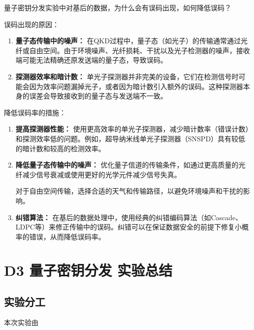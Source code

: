 \documentclass[dvipsnames, svgnames,a4paper,11pt]{article}
\begin{document}
\begin{question}
	量子密钥分发实验中对基后的数据，为什么会有误码出现，如何降低误码？
\end{question}

	误码出现的原因：
	\begin{enumerate}
		\item \textbf{量子态传输中的噪声：}
			在QKD过程中，量子态（如光子）的传输通常通过光纤或自由空间。由于环境噪声、光纤损耗、干扰以及光子检测器的噪声，接收端可能无法精确还原发送端的量子态，导致误码。

		\item \textbf{探测器效率和暗计数：}
			单光子探测器并非完美的设备，它们在检测信号时可能会因为效率问题漏掉光子，或者因为暗计数引入额外的误码。这种探测器本身的误差会导致接收到的量子态与发送端不一致。

	\end{enumerate}

	降低误码率的措施：
	\begin{enumerate}
		\item \textbf{提高探测器性能：}
			使用更高效率的单光子探测器，减少暗计数率（错误计数）和探测效率低的问题。例如，超导纳米线单光子探测器（SNSPD）具有较低的暗计数和较高的检测效率。

		\item \textbf{降低量子态传输中的噪声：}
			优化量子信道的传输条件，如通过更高质量的光纤减少信号衰减或使用更好的光学元件减少信号失真。
		
			对于自由空间传输，选择合适的天气和传输路径，以避免环境噪声和干扰的影响。

		\item \textbf{纠错算法：}
			在基后的数据处理中，使用经典的纠错编码算法（如Cascade、LDPC等）来修正传输中的误码。纠错可以在保证数据安全的前提下修复小概率的错误，从而降低误码率。
	\end{enumerate}


\clearpage
\section{D3 \quad 量子密钥分发 \quad\heiti 实验总结}

	\subsection{实验分工}

		本次实验由
\end{document}
